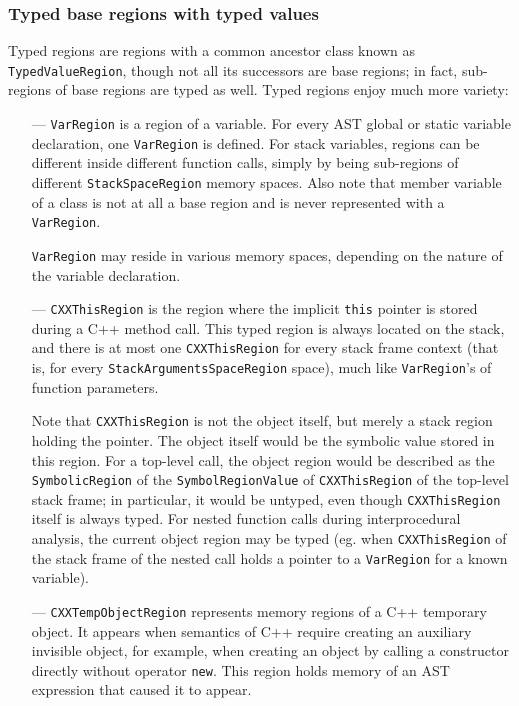 \documentclass[a4paper,12pt]{article}
\begin{document}
\subsubsection{Typed base regions with typed values}

Typed regions are regions with a common ancestor class known as \lstinline|TypedValueRegion|, though not all its successors are base regions; in fact, sub-regions of base regions are typed as well. Typed regions enjoy much more variety:

\begin{itemize}
\item[---]\lstinline|VarRegion| is a region of a variable. For every AST global or static variable declaration, one \lstinline|VarRegion| is defined. For stack variables, regions can be different inside different function calls, simply by being sub-regions of different \lstinline|StackSpaceRegion| memory spaces. Also note that member variable of a class is not at all a base region and is never represented with a \lstinline|VarRegion|.

\lstinline|VarRegion| may reside in various memory spaces, depending on the nature of the variable declaration.

\item[---]\lstinline|CXXThisRegion| is the region where the implicit \lstinline|this| pointer is stored during a C++ method call. This typed region is always located on the stack, and there is at most one \lstinline|CXXThisRegion| for every stack frame context (that is, for every \lstinline|StackArgumentsSpaceRegion| space), much like \lstinline|VarRegion|'s of function parameters.

Note that \lstinline|CXXThisRegion| is not the object itself, but merely a stack region holding the pointer. The object itself would be the symbolic value stored in this region. For a top-level call, the object region would be described as the \lstinline|SymbolicRegion| of the \lstinline|SymbolRegionValue| of \lstinline|CXXThisRegion| of the top-level stack frame; in particular, it would be untyped, even though \lstinline|CXXThisRegion| itself is always typed. For nested function calls during interprocedural analysis, the current object region may be typed (eg. when \lstinline|CXXThisRegion| of the stack frame of the nested call holds a pointer to a \lstinline|VarRegion| for a known variable).
\item[---]\lstinline|CXXTempObjectRegion| represents memory regions of a C++ temporary object. It appears when semantics of C++ require creating an auxiliary invisible object, for example, when creating an object by calling a constructor directly without operator \lstinline|new|. This region holds memory of an AST expression that caused it to appear.


\end{itemize}
\end{document}
